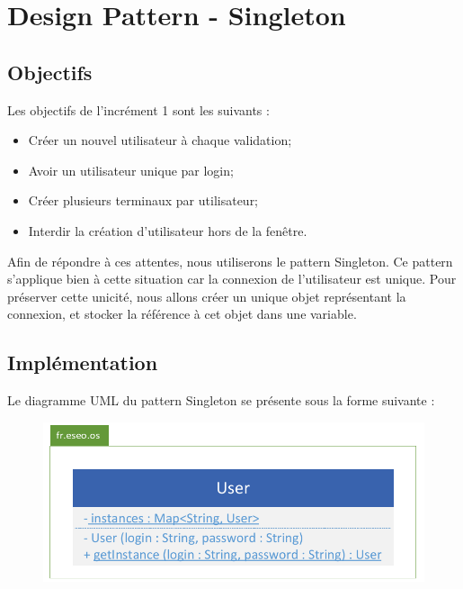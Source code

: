 \newpage
\section{Design Pattern - Singleton}

	\subsection{Objectifs}

	Les objectifs de l'incrément 1 sont les suivants :\\

	\begin{itemize}
	\item Créer un nouvel utilisateur à chaque validation;
	\item Avoir un utilisateur unique par login;
	\item Créer plusieurs terminaux par utilisateur;
	\item Interdir la création d'utilisateur hors de la fenêtre.\\
	\end{itemize}

	Afin de répondre à ces attentes, nous utiliserons le pattern Singleton. Ce pattern s’applique bien à cette situation car la connexion de l’utilisateur est unique. Pour préserver cette unicité, nous allons créer un unique objet représentant la connexion, et stocker la référence à cet objet dans une variable.

	\subsection{Implémentation}

	Le diagramme UML du pattern Singleton se présente sous la forme suivante :

\begin{figure}[!h]
\centering
\includegraphics[width=\textwidth]{../uml/uml-singleton}
\end{figure}

